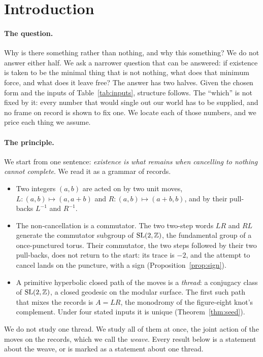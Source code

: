 \section{Introduction}\label{sec:intro}

\paragraph{The question.}
Why is there something rather than nothing, and why this something? We do not answer either half. We ask a narrower
question that can be answered: if existence is taken to be the minimal thing that is not nothing, what does that
minimum force, and what does it leave free? The answer has two halves. Given the chosen form and the inputs of Table~\ref{tab:inputs}, structure follows. The
``which'' is not fixed by it: every number that would single out our world has to be supplied, and no frame on record is
shown to fix one. We locate each of those numbers, and we price each
thing we assume.

\paragraph{The principle.}
We start from one sentence: \emph{existence is what remains when cancelling to nothing cannot complete}. We read it as
a grammar of records.
\begin{itemize}
\item Two integers $(a,b)$ are acted on by two unit moves, $L:(a,b)\mapsto(a,a+b)$ and $R:(a,b)\mapsto(a+b,b)$, and
  by their pull-backs $L^{-1}$ and $R^{-1}$.
\item The non-cancellation is a commutator. The two two-step words $LR$ and $RL$ generate the commutator subgroup of
  $\mathrm{SL}(2,\mathbb{Z})$, the fundamental group of a once-punctured torus. Their commutator, the two steps followed by their two
  pull-backs, does not return to the start: its trace is $-2$, and the attempt to cancel lands on the puncture, with a
  sign (Proposition~\ref{prop:sign}).
\item A primitive hyperbolic closed path of the moves is a \emph{thread}: a conjugacy class of $\mathrm{SL}(2,\mathbb{Z})$, a closed geodesic on
  the modular surface. The first such path that mixes the records is $A=LR$, the monodromy of the figure-eight knot's
  complement. Under four stated inputs it is unique (Theorem~\ref{thm:seed}).
\end{itemize}
We do not study one thread. We study all of them at once, the joint action of the moves on the records, which we call
the \emph{weave}. Every result below is a statement about the weave, or is marked as a statement about one thread.

